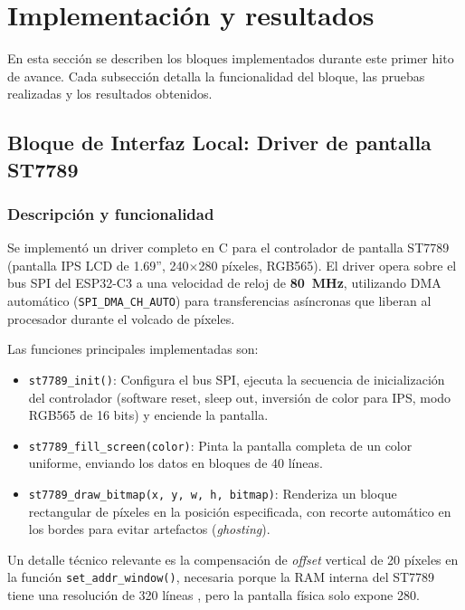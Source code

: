 \documentclass[letterpaper,11pt]{article}
\begin{document}
\section{Implementación y resultados}

En esta sección se describen los bloques implementados durante este primer hito de avance. Cada subsección detalla la funcionalidad del bloque, las pruebas realizadas y los resultados obtenidos.

\subsection{Bloque de Interfaz Local: Driver de pantalla ST7789}

\subsubsection{Descripción y funcionalidad}
Se implementó un driver completo en C para el controlador de pantalla ST7789 \citep{st7789_ds} (pantalla IPS LCD de 1.69'', 240$\times$280 píxeles, RGB565). El driver opera sobre el bus SPI del ESP32-C3 \citep{esp32c3_ds} a una velocidad de reloj de \textbf{80~MHz}, utilizando DMA automático (\texttt{SPI\_DMA\_CH\_AUTO}) para transferencias asíncronas que liberan al procesador durante el volcado de píxeles.

Las funciones principales implementadas son:
\begin{itemize}
    \item \texttt{st7789\_init()}: Configura el bus SPI, ejecuta la secuencia de inicialización del controlador (software reset, sleep out, inversión de color para IPS, modo RGB565 de 16 bits) y enciende la pantalla.
    \item \texttt{st7789\_fill\_screen(color)}: Pinta la pantalla completa de un color uniforme, enviando los datos en bloques de 40 líneas.
    \item \texttt{st7789\_draw\_bitmap(x, y, w, h, bitmap)}: Renderiza un bloque rectangular de píxeles en la posición especificada, con recorte automático en los bordes para evitar artefactos (\textit{ghosting}).
\end{itemize}

Un detalle técnico relevante es la compensación de \textit{offset} vertical de 20 píxeles en la función \texttt{set\_addr\_window()}, necesaria porque la RAM interna del ST7789 tiene una resolución de 320 líneas \citep{st7789_ds}, pero la pantalla física solo expone 280.
\end{document}
